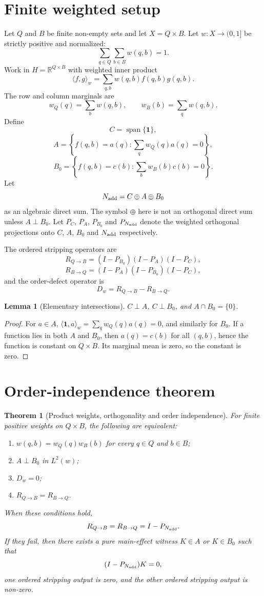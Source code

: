 \documentclass[11pt]{article}
\newtheorem{theorem}{Theorem}
\newtheorem{lemma}{Lemma}
\theoremstyle{remark}
\newcommand{\R}{\mathbb{R}}
\newcommand{\one}{\mathbf{1}}
\newcommand{\ip}[2]{\langle #1,#2\rangle_w}
\newcommand{\RQBt}{R_{Q\to B}}
\newcommand{\RBQt}{R_{B\to Q}}
\begin{document}
\section{Finite weighted setup}

Let $Q$ and $B$ be finite non-empty sets and let $X=Q\times B$. Let $w:X\to(0,1]$ be strictly positive and normalized:
\[
\sum_{q\in Q}\sum_{b\in B} w(q,b)=1.
\]
Work in $H=\R^{Q\times B}$ with weighted inner product
\[
\ip{f}{g}=\sum_{q,b} w(q,b)f(q,b)g(q,b).
\]
The row and column marginals are
\[
w_Q(q)=\sum_b w(q,b),\qquad w_B(b)=\sum_q w(q,b).
\]
Define
\[
C=\operatorname{span}\{\one\},
\]
\[
A=\left\{f(q,b)=a(q):\sum_q w_Q(q)a(q)=0\right\},
\]
\[
B_0=\left\{f(q,b)=c(b):\sum_b w_B(b)c(b)=0\right\}.
\]
Let
\[
N_{\rm add}=C\oplus A\oplus B_0
\]
as an algebraic direct sum. The symbol $\oplus$ here is not an orthogonal direct sum unless $A\perp B_0$. Let $P_C$, $P_A$, $P_{B_0}$ and $P_{N_{\rm add}}$ denote the weighted orthogonal projections onto $C$, $A$, $B_0$ and $N_{\rm add}$ respectively.

The ordered stripping operators are
\[
\RQBt=(I-P_{B_0})(I-P_A)(I-P_C),
\]
\[
\RBQt=(I-P_A)(I-P_{B_0})(I-P_C),
\]
and the order-defect operator is
\[
D_w=\RQBt-\RBQt.
\]

\begin{lemma}[Elementary intersections]
$C\perp A$, $C\perp B_0$, and $A\cap B_0=\{0\}$.
\end{lemma}

\begin{proof}
For $a\in A$, $\ip{\one}{a}=\sum_q w_Q(q)a(q)=0$, and similarly for $B_0$. If a function lies in both $A$ and $B_0$, then $a(q)=c(b)$ for all $(q,b)$, hence the function is constant on $Q\times B$. Its marginal mean is zero, so the constant is zero.
\end{proof}

\section{Order-independence theorem}

\begin{theorem}[Product weights, orthogonality and order independence]
For finite positive weights on $Q\times B$, the following are equivalent:
\begin{enumerate}[label=(\roman*),leftmargin=*]
\item $w(q,b)=w_Q(q)w_B(b)$ for every $q\in Q$ and $b\in B$;
\item $A\perp B_0$ in $L^2(w)$;
\item $D_w=0$;
\item $\RQBt=\RBQt$.
\end{enumerate}
When these conditions hold,
\[
\RQBt=\RBQt=I-P_{N_{\rm add}}.
\]
If they fail, then there exists a pure main-effect witness $K\in A$ or $K\in B_0$ such that
\[
(I-P_{N_{\rm add}})K=0,
\]
one ordered stripping output is zero, and the other ordered stripping output is non-zero.
\end{theorem}
\end{document}
